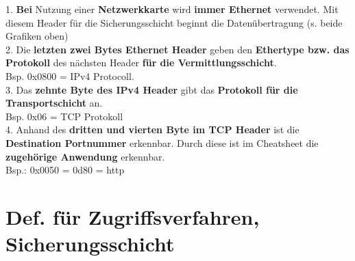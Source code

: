 \documentclass[fs, footer]{latex4ei}
\begin{document}
\begin{multicols*}{4}
{1. \textbf{Bei} Nutzung einer \textbf{Netzwerkkarte} wird \textbf{immer Ethernet} verwendet. Mit diesem Header für die Sicherungsschicht beginnt die Datenübertragung (s. beide Grafiken oben)\\ %
2. Die \textbf{letzten zwei Bytes Ethernet Header} geben den \textbf{Ethertype bzw. das Protokoll} des nächsten Header \textbf{für die Vermittlungsschicht}. \\
Bsp. 0x0800 = IPv4 Protocoll.\\
3. Das \textbf{zehnte Byte des IPv4 Header} gibt das \textbf{Protokoll für die Transportschicht} an. \\
Bsp. 0x06 = TCP Protokoll\\
4. Anhand des \textbf{dritten und vierten Byte im TCP Header} ist die \textbf{Destination Portnummer} erkennbar. Durch diese ist im Cheatsheet die \textbf{zugehörige Anwendung} erkennbar. \\
Bsp.: 0x0050 = 0d80 = http \\




}



\section{Def. für Zugriffsverfahren, Sicherungsschicht}


\end{multicols*}
\end{document}
